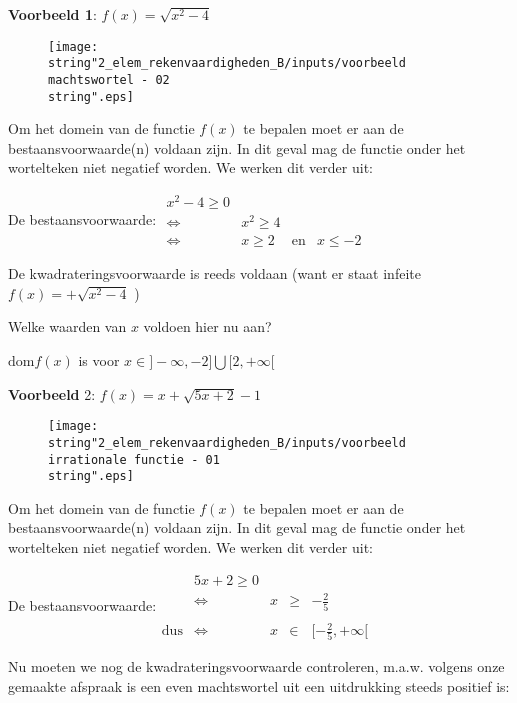 \medskip{}


\textbf{Voorbeeld 1}: ${\displaystyle f(x)=\sqrt{x^{2}-4}}$ 

\begin{figure}[h]
\centering
\texttt{[image: \\string"2\_elem\_rekenvaardigheden\_B/inputs/voorbeeld machtswortel - 02\\string".eps]}
\end{figure}
\medskip{}


Om het domein van de functie $f(x)$ te bepalen moet er aan de bestaansvoorwaarde(n)
voldaan zijn. In dit geval mag de functie onder het wortelteken niet
negatief worden. We werken dit verder uit:

De bestaansvoorwaarde: $\begin{array}{cccl}
x^{2}-4\geq0\\
\Longleftrightarrow & x^{2}\geq4\\
\Longleftrightarrow & x\geq2 & \textrm{en} & x\leq-2
\end{array}$

De kwadrateringsvoorwaarde is reeds voldaan (want er staat infeite
${\displaystyle f(x)=+\sqrt{x^{2}-4}}$ )

Welke waarden van $x$ voldoen hier nu aan?

${\displaystyle \textrm{dom}f(x)}$ is voor $x\in]-\infty,-2]\bigcup[2,+\infty[$ 

\medskip{}


\textbf{Voorbeeld }2: ${\displaystyle f(x)=x+\sqrt{5x+2}-1}$ 

\begin{figure}
\centering
\texttt{[image: \\string"2\_elem\_rekenvaardigheden\_B/inputs/voorbeeld irrationale functie - 01\\string".eps]}
\end{figure}
\medskip{}


Om het domein van de functie $f(x)$ te bepalen moet er aan de bestaansvoorwaarde(n)
voldaan zijn. In dit geval mag de functie onder het wortelteken niet
negatief worden. We werken dit verder uit:

De bestaansvoorwaarde:${\displaystyle \begin{array}{cclcc}
 & 5x+2\geq0\\
 & \Longleftrightarrow & x & \geq & -\frac{2}{5}\\
\\
\textrm{dus} & \Longleftrightarrow & x & \in & [-\frac{2}{5},+\infty[
\end{array}}$

\medskip{}


Nu moeten we nog de kwadrateringsvoorwaarde controleren, m.a.w. volgens
onze gemaakte afspraak is een even machtswortel uit een uitdrukking
steeds positief is:

